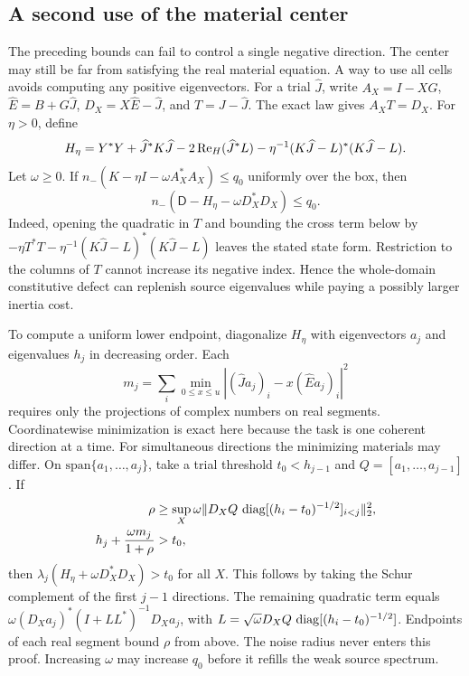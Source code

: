\subsection{A second use of the material center}\label{sec:defect}

The preceding bounds can fail to control a single negative direction. The center may still be far from satisfying the real material equation. A way to use all cells avoids computing any positive eigenvectors. For a trial $\widehat J$, write $A_X=I-XG$, $\widehat E=B+G\widehat J$, $D_X=X\widehat E-\widehat J$, and $T=J-\widehat J$. The exact law gives $A_XT=D_X$. For $\eta>0$, define
\begin{equation}
 H_\eta=Y^*Y+\widehat J^*K\widehat J-2\operatorname{Re}_{H}(\widehat J^*L)
             -\eta^{-1}(K\widehat J-L)^*(K\widehat J-L).
 \label{eq:trial}
\end{equation}
Let $\omega\ge0$. If $n_-(K-\eta I-\omega A_X^*A_X)\le q_0$ uniformly over the box, then
\begin{equation}
 n_-(\mathsf D-H_\eta-\omega D_X^*D_X)\le q_0 .
 \label{eq:full_def}
\end{equation}
Indeed, opening the quadratic in $T$ and bounding the cross term below by $-\eta T^*T-\eta^{-1}(K\widehat J-L)^*(K\widehat J-L)$ leaves the stated state form. Restriction to the columns of $T$ cannot increase its negative index. Hence the whole-domain constitutive defect can replenish source eigenvalues while paying a possibly larger inertia cost.

To compute a uniform lower endpoint, diagonalize $H_\eta$ with eigenvectors $a_j$ and eigenvalues $h_j$ in decreasing order. Each
\[
 m_j=\sum_i\min_{0\le x\le u}|(\widehat J a_j)_i-x(\widehat E a_j)_i|^2
\]
requires only the projections of complex numbers on real segments. Coordinatewise minimization is exact here because the task is one coherent direction at a time. For simultaneous directions the minimizing materials may differ. On $\mathrm{span}\{a_1,\ldots,a_j\}$, take a trial threshold $t_0<h_{j-1}$ and $Q=[a_1,\ldots,a_{j-1}]$. If
\begin{align}
 \rho&\ge\sup_X\omega\|D_XQ\,\operatorname{diag}[(h_i-t_0)^{-1/2}]_{i<j}\|_2^2,\nonumber\\
 h_j+\frac{\omega m_j}{1+\rho}&>t_0,
 \label{eq:filling}
\end{align}
then $\lambda_j(H_\eta+\omega D_X^*D_X)>t_0$ for all $X$. This follows by taking the Schur complement of the first $j-1$ directions. The remaining quadratic term equals $\omega (D_X a_j)^*(I+LL^*)^{-1}D_Xa_j$, with $L=\sqrt{\omega}D_XQ\,\operatorname{diag}[(h_i-t_0)^{-1/2}]$. Endpoints of each real segment bound $\rho$ from above. The noise radius never enters this proof. Increasing $\omega$ may increase $q_0$ before it refills the weak source spectrum.

